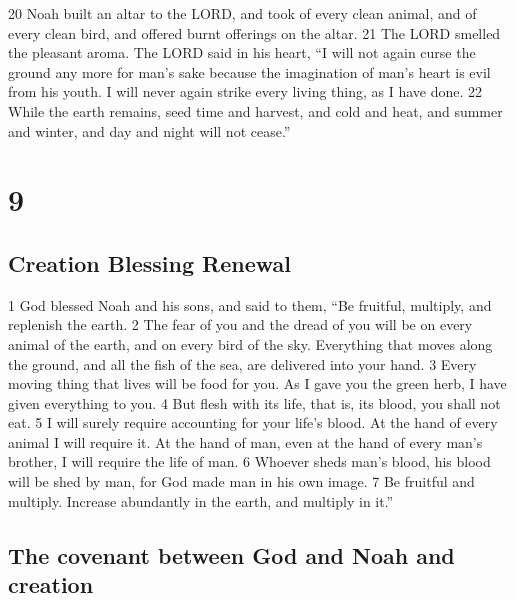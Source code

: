 {20} Noah built an altar to the LORD, and took of every clean animal,
and of every clean bird, and offered burnt offerings on the altar. {21}
The LORD smelled the pleasant aroma. The LORD said in his heart, ``I
will not again curse the ground any more for man's sake because the
imagination of man's heart is evil from his youth. I will never again
strike every living thing, as I have done. {22} While the earth remains,
seed time and harvest, and cold and heat, and summer and winter, and day
and night will not cease.''

\hypertarget{section-8}{%
\section{9}\label{section-8}}

\hypertarget{creation-blessing-renewal}{%
\subsection{Creation Blessing Renewal}\label{creation-blessing-renewal}}

{1} God blessed Noah and his sons, and said to them, ``Be fruitful,
multiply, and replenish the earth. {2} The fear of you and the dread of
you will be on every animal of the earth, and on every bird of the sky.
Everything that moves along the ground, and all the fish of the sea, are
delivered into your hand. {3} Every moving thing that lives will be food
for you. As I gave you the green herb, I have given everything to you.
{4} But flesh with its life, that is, its blood, you shall not eat. {5}
I will surely require accounting for your life's blood. At the hand of
every animal I will require it. At the hand of man, even at the hand of
every man's brother, I will require the life of man. {6} Whoever sheds
man's blood, his blood will be shed by man, for God made man in his own
image. {7} Be fruitful and multiply. Increase abundantly in the earth,
and multiply in it.''

\hypertarget{the-covenant-between-god-and-noah-and-creation}{%
\subsection{The covenant between God and Noah and
creation}\label{the-covenant-between-god-and-noah-and-creation}}

